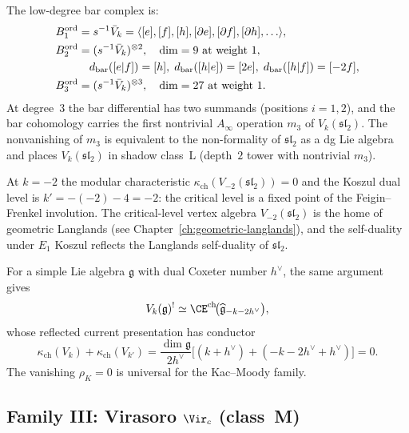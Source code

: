 The low-degree bar complex is:
\begin{align}
 B^{\mathrm{ord}}_1 &= s^{-1}\bar{V}_k =
 \langle [e], [f], [h], [\partial e], [\partial f], [\partial h],
 \ldots \rangle, \notag \\
 B^{\mathrm{ord}}_2 &= (s^{-1}\bar{V}_k)^{\otimes 2},
 \quad \dim = 9 \text{ at weight $1$},
 \label{eq:sl2-bar-2} \\
 & \quad d_{\mathrm{bar}}([e|f]) = [h], \;
 d_{\mathrm{bar}}([h|e]) = [2e], \;
 d_{\mathrm{bar}}([h|f]) = [-2f], \notag \\
 B^{\mathrm{ord}}_3 &= (s^{-1}\bar{V}_k)^{\otimes 3},
 \quad \dim = 27 \text{ at weight $1$}.
 \label{eq:sl2-bar-3}
\end{align}
At degree~$3$ the bar differential has two summands (positions $i=1,2$),
and the bar cohomology carries the first nontrivial $A_\infty$ operation
$m_3$ of $V_k(\mathfrak{sl}_2)$. The nonvanishing of $m_3$ is equivalent
to the non-formality of $\mathfrak{sl}_2$ as a dg Lie algebra
and places $V_k(\mathfrak{sl}_2)$ in shadow class~L (depth~$2$ tower
with nontrivial $m_3$).

\begin{remark}[Critical level \texorpdfstring{$k = -2$}{k = -2}]
\label{rem:critical-level}
At $k = -2$ the modular characteristic
$\kappa_{\mathrm{ch}}(V_{-2}(\mathfrak{sl}_2)) = 0$ and the Koszul dual
level is $k' = -(-2) - 4 = -2$: the critical level is a fixed point of
the Feigin--Frenkel involution. The critical-level vertex algebra
$V_{-2}(\mathfrak{sl}_2)$ is the home of geometric Langlands (see
Chapter~\ref{ch:geometric-langlands}), and the self-duality under $E_1$
Koszul reflects the Langlands self-duality of $\mathfrak{sl}_2$.
\end{remark}

\begin{remark}
\label{rem:general-g-koszul}
For a simple Lie algebra $\mathfrak{g}$ with dual Coxeter number
$h^\vee$, the same argument gives
\[
V_k(\mathfrak{g})^!
\simeq
\CE^{\mathrm{ch}}\!\bigl(\widehat{\mathfrak g}_{-k-2h^\vee}\bigr),
\]
whose reflected current presentation has conductor
\[
 \kappa_{\mathrm{ch}}(V_k) + \kappa_{\mathrm{ch}}(V_{k'}) =
 \frac{\dim\mathfrak{g}}{2h^\vee}\bigl[(k + h^\vee) +
 (-k - 2h^\vee + h^\vee)\bigr] = 0.
\]
The vanishing $\rho_K = 0$ is universal for the Kac--Moody family.
\end{remark}

\subsection{Family III: Virasoro \texorpdfstring{$\Vir_c$}{Vir-c} (class~M)}
\label{subsec:koszul-virasoro}

